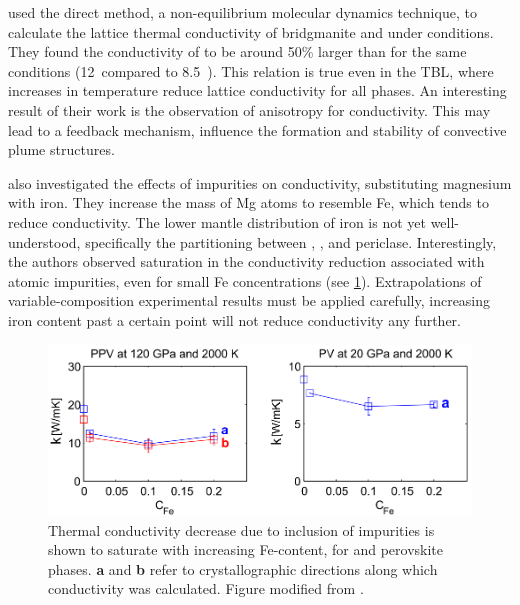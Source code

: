 \citet{Ammann2014} used the direct method, a non-equilibrium molecular dynamics technique, to calculate the lattice thermal conductivity of bridgmanite and \ppvs under \ddds conditions. They found the conductivity of \ppv to be around 50\% larger than \bdg for the same conditions (12~\wmks compared to 8.5~\wmk). This relation is true even in the TBL, where increases in temperature reduce lattice conductivity for all \mgsios phases. An interesting result of their work is the observation of anisotropy for \ppvs conductivity. This may lead to a feedback mechanism, influence the formation and stability of convective plume structures.

\citeauthor{Ammann2014} also investigated the effects of impurities on conductivity, substituting magnesium with iron. They increase the mass of Mg atoms to resemble Fe, which tends to reduce conductivity. The lower mantle distribution of iron is not yet well-understood, specifically the partitioning between \bdg, \ppv, and periclase. Interestingly, the authors observed saturation in the conductivity reduction associated with atomic impurities, even for small Fe concentrations (see \ref{fig:ammann_sat}). Extrapolations of variable-composition experimental results must be applied carefully, increasing iron content past a certain point will not reduce conductivity any further.

\begin{figure}[h!]
  \includegraphics[width=\linewidth]{Figures/ammann_saturation.png}
  \caption[Thermal conductivity against Fe-content]{Thermal conductivity decrease due to inclusion of impurities is shown to saturate with increasing Fe-content, for \mgsios \ppv and perovskite phases. \textbf{a} and \textbf{b} refer to crystallographic directions along which conductivity was calculated. Figure modified from \citet{Ammann2014}.}
  \label{fig:ammann_sat}
\end{figure}


